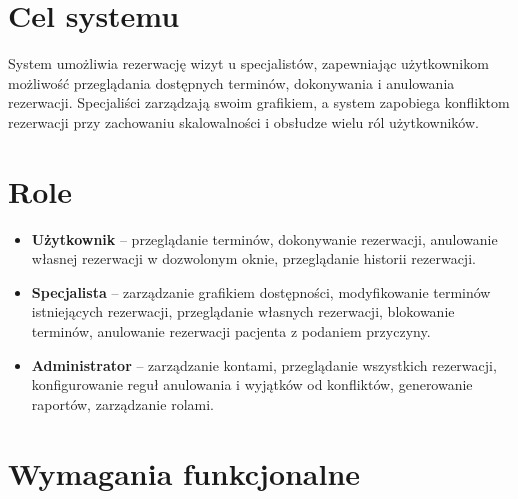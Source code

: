 \documentclass[12pt,a4paper]{article}
\begin{document}
\section{Cel systemu}

System umożliwia rezerwację wizyt u specjalistów, zapewniając użytkownikom możliwość przeglądania dostępnych terminów, dokonywania i anulowania rezerwacji. Specjaliści zarządzają swoim grafikiem, a system zapobiega konfliktom rezerwacji przy zachowaniu skalowalności i obsłudze wielu ról użytkowników.

\section{Role}

\begin{itemize}[leftmargin=1.5em]
  \item \textbf{Użytkownik} -- przeglądanie terminów, dokonywanie rezerwacji, anulowanie własnej rezerwacji w dozwolonym oknie, przeglądanie historii rezerwacji.
  \item \textbf{Specjalista} -- zarządzanie grafikiem dostępności, modyfikowanie terminów istniejących rezerwacji, przeglądanie własnych rezerwacji, blokowanie terminów, anulowanie rezerwacji pacjenta z podaniem przyczyny.
  \item \textbf{Administrator} -- zarządzanie kontami, przeglądanie wszystkich rezerwacji, konfigurowanie reguł anulowania i wyjątków od konfliktów, generowanie raportów, zarządzanie rolami.
\end{itemize}

\section{Wymagania funkcjonalne}
\end{document}
